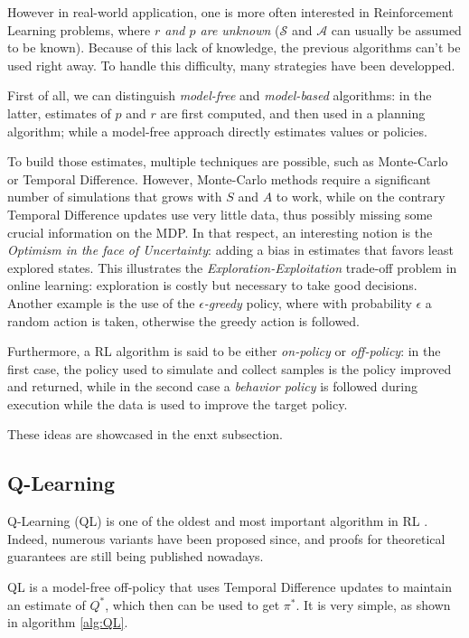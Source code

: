 However in real-world application, one is more often interested in Reinforcement Learning problems, where \emph{$r$ and $p$ are unknown} ($\mathcal{S}$ and $\mathcal{A}$ can usually be assumed to be known). Because of this lack of knowledge, the previous algorithms can't be used right away. To handle this difficulty, many strategies have been developped.

First of all, we can distinguish \emph{model-free} and \emph{model-based} algorithms: in the latter, estimates of $p$ and $r$ are first computed, and then used in a planning algorithm; while a model-free approach directly estimates values or policies.

To build those estimates, multiple techniques are possible, such as Monte-Carlo or Temporal Difference. However, Monte-Carlo methods require a significant number of simulations that grows with $S$ and $A$ to work, while on the contrary Temporal Difference updates use very little data, thus possibly missing some crucial information on the MDP. In that respect, an interesting notion is the \emph{Optimism in the face of Uncertainty}: adding a bias in estimates that favors least explored states. This illustrates the \emph{Exploration-Exploitation} trade-off problem in online learning: exploration is costly but necessary to take good decisions. Another example is the use of the \emph{$\epsilon$-greedy} policy, where with probability $\epsilon$ a random action is taken, otherwise the greedy action is followed.

Furthermore, a RL algorithm is said to be either \emph{on-policy} or \emph{off-policy}: in the first case, the policy used to simulate and collect samples is the policy improved and returned, while in the second case a \emph{behavior policy} is followed during execution while the data is used to improve the target policy.

These ideas are showcased in the enxt subsection.

\subsection{Q-Learning}
\label{subsec:Rl-QL}

Q-Learning (QL) is one of the oldest and most important algorithm in RL \citep{watkins1989learning}. Indeed, numerous variants have been proposed since, and proofs for theoretical guarantees are still being published nowadays.

QL is a model-free off-policy that uses Temporal Difference updates to maintain an estimate of $Q^*$, which then can be used to get $\pi^*$. It is very simple, as shown in algorithm \ref{alg:QL}.

